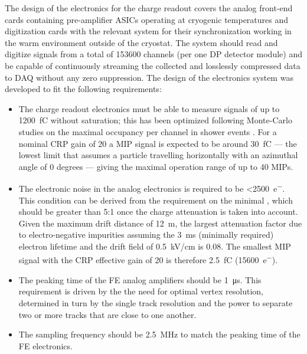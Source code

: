 The design of the electronics for the charge readout covers the analog front-end cards containing pre-amplifier ASICs operating at cryogenic temperatures and digitization cards with the relevant system for their synchronization working in the warm environment outside of the cryostat. The system should read and digitize signals from a total of \num{153600} channels (per one DP detector module) and be capable of continuously streaming the collected and losslessly compressed data to DAQ without any zero suppression. 
The design of the  electronics system was developed to fit the following requirements:
\begin{itemize}
\item{The charge readout electronics must be able to measure signals of up to \SI{1200}{\femto\coulomb} without saturation; this has been optimized following Monte-Carlo studies on the maximal occupancy per channel in shower events \cite{WA105_TDR}. For a nominal CRP gain of \num{20} a MIP signal is expected to be around \SI{30}{fC} --- the lowest limit that assumes a particle travelling horizontally with an azimuthal angle of \num{0} degrees --- giving the maximal operation range of up to \num{40} MIPs.}
\item{The electronic noise in the  analog electronics is required to be \SI{<2500}{e^{-}}. This condition can be derived from the requirement on the minimal , which should be greater than \num{5}:\num{1} once the charge attenuation is taken into account. Given the maximum drift distance of \SI{12}{\meter}, the largest attenuation factor due to electro-negative impurities assuming the \SI{3}{\milli\second} (minimally required) electron lifetime and the drift field of \SI{0.5}{\kilo\volt/\cm} is \num{0.08}. The smallest MIP signal with the CRP effective gain of \num{20} is therefore \SI{2.5}{\femto\coulomb} (\SI{15600}{e^{-}}).}
\item{The peaking time of the FE analog amplifiers should be \SI{1}{\micro\second}. This requirement is driven by the the need for optimal vertex resolution, determined in turn by the single track resolution and the power to separate two or more tracks that are close to one another.}
\item{The sampling frequency should be \SI{2.5}{\MHz} to match the peaking time of the FE electronics.}


\end{itemize}
